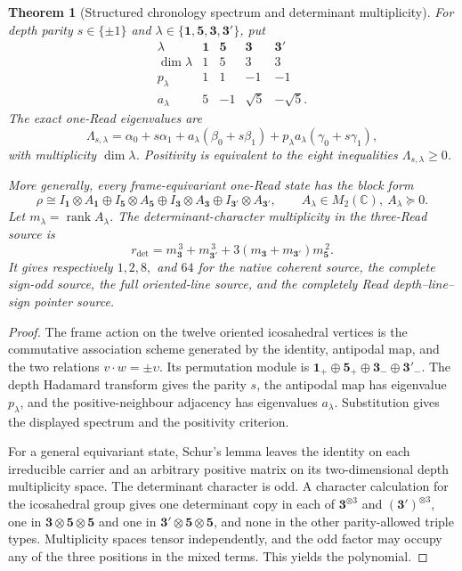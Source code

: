 \documentclass[11pt]{article}
\newtheorem{theorem}{Theorem}[section]
\theoremstyle{definition}
\theoremstyle{remark}
\newcommand{\C}{\mathbb C}
\newcommand{\rank}{\operatorname{rank}}
\begin{document}
\begin{theorem}[Structured chronology spectrum and determinant multiplicity]
\label{thm:structured-determinant-source-master}
For depth parity $s\in\{\pm1\}$ and
$\lambda\in\{\mathbf1,\mathbf5,\mathbf3,\mathbf3'\}$, put
\[
\begin{array}{c|cccc}
\lambda&\mathbf1&\mathbf5&\mathbf3&\mathbf3'\\ \hline
\dim\lambda&1&5&3&3\\
p_\lambda&1&1&-1&-1\\
a_\lambda&5&-1&\sqrt5&-\sqrt5.
\end{array}
\]
The exact one-Read eigenvalues are
\[
 \boxed{
 \Lambda_{s,\lambda}
 =\alpha_0+s\alpha_1
  +a_\lambda(\beta_0+s\beta_1)
  +p_\lambda a_\lambda(\gamma_0+s\gamma_1),}
\]
with multiplicity $\dim\lambda$.  Positivity is equivalent to the eight
inequalities $\Lambda_{s,\lambda}\ge0$.

More generally, every frame-equivariant one-Read state has the block form
\[
 \rho\cong
 I_{\mathbf1}\otimes A_{\mathbf1}
 \oplus I_{\mathbf5}\otimes A_{\mathbf5}
 \oplus I_{\mathbf3}\otimes A_{\mathbf3}
 \oplus I_{\mathbf3'}\otimes A_{\mathbf3'},
 \qquad A_\lambda\in M_2(\C),\ A_\lambda\succeq0.
\]
Let $m_\lambda=\rank A_\lambda$.  The determinant-character multiplicity in
the three-Read source is
\[
 \boxed{
 r_{\det}
 =m_{\mathbf3}^{\,3}+m_{\mathbf3'}^{\,3}
 +3(m_{\mathbf3}+m_{\mathbf3'})m_{\mathbf5}^{\,2}.}
\]
It gives respectively $1,2,8,$ and $64$ for the native coherent source, the
complete sign-odd source, the full oriented-line source, and the completely
Read depth--line--sign pointer source.
\end{theorem}

\begin{proof}
The frame action on the twelve oriented icosahedral vertices is the commutative
association scheme generated by the identity, antipodal map, and the two
relations $v\cdot w=\pm\upsilon$.  Its permutation module is
$\mathbf1_+\oplus\mathbf5_+\oplus\mathbf3_-\oplus\mathbf3'_-$.
The depth Hadamard transform gives the parity $s$, the antipodal map has
eigenvalue $p_\lambda$, and the positive-neighbour adjacency has eigenvalues
$a_\lambda$.  Substitution gives the displayed spectrum and the positivity
criterion.

For a general equivariant state, Schur's lemma leaves the identity on each
irreducible carrier and an arbitrary positive matrix on its two-dimensional
depth multiplicity space.  The determinant character is odd.  A character
calculation for the icosahedral group gives one determinant copy in each of
$\mathbf3^{\otimes3}$ and $(\mathbf3')^{\otimes3}$, one in
$\mathbf3\otimes\mathbf5\otimes\mathbf5$ and one in
$\mathbf3'\otimes\mathbf5\otimes\mathbf5$, and none in the other parity-allowed
triple types.  Multiplicity spaces tensor independently, and the odd factor may
occupy any of the three positions in the mixed terms.  This yields the
polynomial.
\end{proof}
\end{document}
